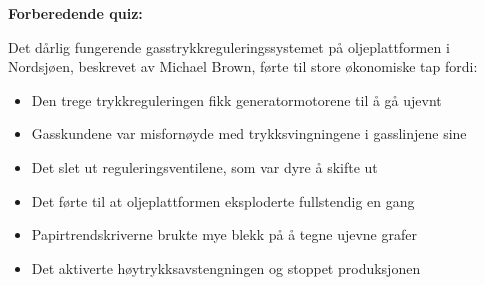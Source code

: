 \vfil \eject

\noindent
{\bf Forberedende quiz:}

Det dårlig fungerende gasstrykkreguleringssystemet på oljeplattformen i Nordsjøen, beskrevet av Michael Brown, førte til store økonomiske tap fordi:

\begin{itemize}
\item{} Den trege trykkreguleringen fikk generatormotorene til å gå ujevnt
\vskip 5pt 
\item{} Gasskundene var misfornøyde med trykksvingningene i gasslinjene sine
\vskip 5pt 
\item{} Det slet ut reguleringsventilene, som var dyre å skifte ut
\vskip 5pt 
\item{} Det førte til at oljeplattformen eksploderte fullstendig en gang
\vskip 5pt 
\item{} Papirtrendskriverne brukte mye blekk på å tegne ujevne grafer
\vskip 5pt 
\item{} Det aktiverte høytrykksavstengningen og stoppet produksjonen
\end{itemize}



